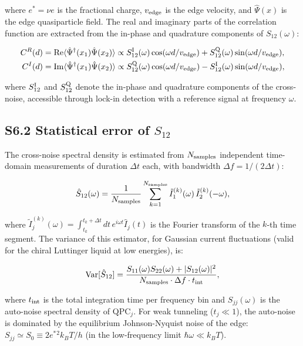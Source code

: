 \documentclass[prd,aps,showpacs,superscriptaddress,twocolumn]{revtex4-2}
\begin{document}
where $e^* = \nu e$ is the fractional charge, $v_{\rm edge}$ is the edge velocity, and $\hat{\Psi}(x)$ is the edge quasiparticle field. The real and imaginary parts of the correlation function are extracted from the in-phase and quadrature components of $S_{12}(\omega)$:

\begin{align}
C^R(d) &= {\rm Re} \langle \hat{\Psi}^\dagger(x_1) \hat{\Psi}(x_2) \rangle \propto S_{12}^{\rm I}(\omega) \cos(\omega d/v_{\rm edge}) + S_{12}^{\rm Q}(\omega) \sin(\omega d/v_{\rm edge}), \label{eq:CR_extract}\\
C^I(d) &= {\rm Im} \langle \hat{\Psi}^\dagger(x_1) \hat{\Psi}(x_2) \rangle \propto S_{12}^{\rm Q}(\omega) \cos(\omega d/v_{\rm edge}) - S_{12}^{\rm I}(\omega) \sin(\omega d/v_{\rm edge}), \label{eq:CI_extract}
\end{align}

where $S_{12}^{\rm I}$ and $S_{12}^{\rm Q}$ denote the in-phase and quadrature components of the cross-noise, accessible through lock-in detection with a reference signal at frequency $\omega$.

\subsection{S6.2 Statistical error of $S_{12}$}

The cross-noise spectral density is estimated from $N_{\rm samples}$ independent time-domain measurements of duration $\Delta t$ each, with bandwidth $\Delta f = 1/(2\Delta t)$:

\begin{equation}
\hat{S}_{12}(\omega) = \frac{1}{N_{\rm samples}} \sum_{k=1}^{N_{\rm samples}} \tilde{I}_1^{(k)}(\omega) \, \tilde{I}_2^{(k)}(-\omega),
\label{eq:S12_estimator}
\end{equation}

where $\tilde{I}_j^{(k)}(\omega) = \int_{t_k}^{t_k+\Delta t} dt \, e^{i\omega t} \hat{I}_j(t)$ is the Fourier transform of the $k$-th time segment. The variance of this estimator, for Gaussian current fluctuations (valid for the chiral Luttinger liquid at low energies), is:

\begin{equation}
{\rm Var}[\hat{S}_{12}] = \frac{S_{11}(\omega) S_{22}(\omega) + |S_{12}(\omega)|^2}{N_{\rm samples} \cdot \Delta f \cdot t_{\rm int}},
\label{eq:var_S12}
\end{equation}

where $t_{\rm int}$ is the total integration time per frequency bin and $S_{jj}(\omega)$ is the auto-noise spectral density of QPC$_j$. For weak tunneling ($t_j \ll 1$), the auto-noise is dominated by the equilibrium Johnson-Nyquist noise of the edge: $S_{jj} \simeq S_0 \equiv 2 e^*{}^2 k_B T / h$ (in the low-frequency limit $\hbar\omega \ll k_B T$).
\end{document}
